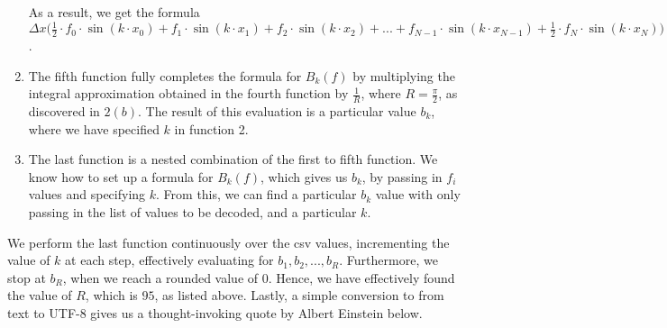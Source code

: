 \begin{enumerate}
\newline As a result, we get the formula $\Delta x \bigg(\frac{1}{2} \cdot f_0 \cdot \sin(k \cdot x_0) + f_1 \cdot \sin(k \cdot x_1) + f_2 \cdot \sin(k \cdot x_2) + ... + f_{N-1} \cdot \sin(k \cdot x_{N-1}) + \frac{1}{2} \cdot f_N \cdot \sin(k \cdot x_N)\bigg)$.
\item The fifth function fully completes the formula for $B_k(f)$ by multiplying the integral approximation obtained in the fourth function by $\frac{1}{R}$, where $R = \frac{\pi}{2}$, as discovered in $2(b)$.
\vspace{0.1cm}
\newline
The result of this evaluation is a particular value $b_k$, where we have specified $k$ in function 2.
\item The last function is a nested combination of the first to fifth function. 
We know how to set up a formula for $B_k(f)$, which gives us $b_k$, 
by passing in $f_i$ values and specifying $k$. 
From this, we can find a particular $b_k$ value with only passing in the list of values to be decoded, and a particular $k$.
\end{enumerate}

We perform the last function continuously over the csv values, incrementing the value of $k$ at each step, 
effectively evaluating for $b_1, b_2, ... , b_R$. 
Furthermore, we stop at $b_R$, when we reach a rounded value of $0$. 
Hence, we have effectively found the value of $R$, which is $95$, as listed above. 
Lastly, a simple conversion to from text to UTF-8 gives us a thought-invoking quote by Albert Einstein below.

